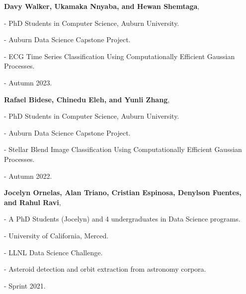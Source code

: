 \begin{innerlist}

  \item[] \textbf{Davy Walker, Ukamaka Nnyaba, and Hewan Shemtaga},
  \begin{innerlist}
    \item[-] PhD Students in Computer Science, Auburn University.
    \item[-] Auburn Data Science Capstone Project.
    \item[-] ECG Time Series Classification Using Computationally Efficient Gaussian Processes.
    \item[-] Autumn 2023.
  \end{innerlist}

  \item[] \textbf{Rafael Bidese, Chinedu Eleh, and Yunli Zhang},
  \begin{innerlist}
    \item[-] PhD Students in Computer Science, Auburn University.
    \item[-] Auburn Data Science Capstone Project.
    \item[-] Stellar Blend Image Classification Using Computationally Efficient Gaussian Processes.
    \item[-] Autumn 2022.
  \end{innerlist}

  \item[] \textbf{Jocelyn Ornelas, Alan Triano, Cristian Espinosa, Denylson Fuentes, and Rahul Ravi},
  \begin{innerlist}
    \item[-] A PhD Students (Jocelyn) and 4 undergraduates in Data Science programs.
    \item[-] University of California, Merced.
    \item[-] LLNL Data Science Challenge.
    \item[-] Asteroid detection and orbit extraction from astronomy corpora.
    \item[-] Sprint 2021.
  \end{innerlist}

\end{innerlist}

